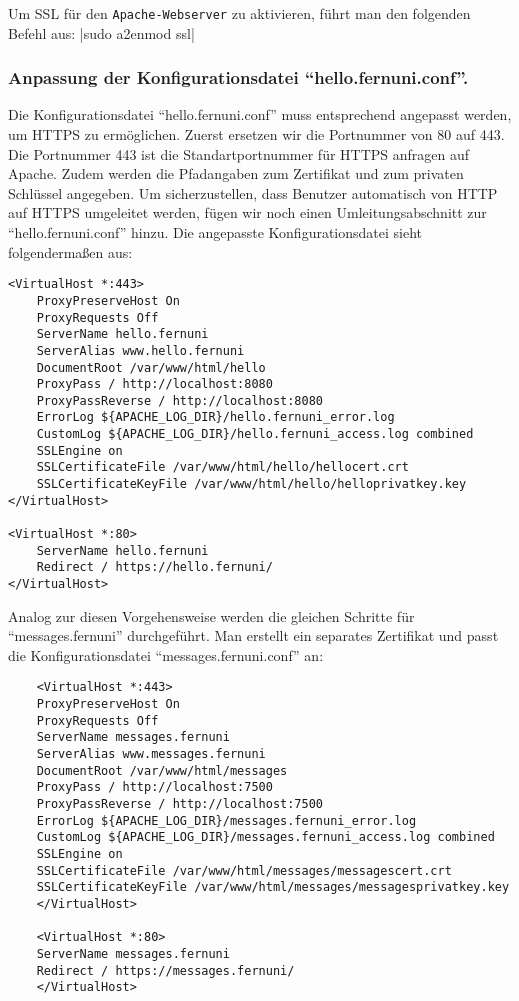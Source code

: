 Um SSL für den \verb+Apache-Webserver+ zu aktivieren, führt man den folgenden Befehl aus:
|sudo a2enmod ssl|

\subsubsection*{Anpassung der Konfigurationsdatei \enquote{hello.fernuni.conf}.}

Die Konfigurationsdatei \enquote{hello.fernuni.conf} muss entsprechend angepasst werden, um HTTPS zu ermöglichen. Zuerst ersetzen wir die Portnummer von 80 auf 443. Die Portnummer 443 ist die Standartportnummer für HTTPS anfragen auf Apache. Zudem werden die Pfadangaben zum Zertifikat und zum privaten Schlüssel angegeben.
Um sicherzustellen, dass Benutzer automatisch von HTTP auf HTTPS umgeleitet werden, fügen wir noch einen Umleitungsabschnitt zur \enquote{hello.fernuni.conf} hinzu. Die angepasste Konfigurationsdatei sieht folgendermaßen aus:
\begin{verbatim}
<VirtualHost *:443>
    ProxyPreserveHost On
    ProxyRequests Off
    ServerName hello.fernuni
    ServerAlias www.hello.fernuni
    DocumentRoot /var/www/html/hello
    ProxyPass / http://localhost:8080
    ProxyPassReverse / http://localhost:8080
    ErrorLog ${APACHE_LOG_DIR}/hello.fernuni_error.log
    CustomLog ${APACHE_LOG_DIR}/hello.fernuni_access.log combined
    SSLEngine on
    SSLCertificateFile /var/www/html/hello/hellocert.crt
    SSLCertificateKeyFile /var/www/html/hello/helloprivatkey.key
</VirtualHost>

<VirtualHost *:80>
    ServerName hello.fernuni
    Redirect / https://hello.fernuni/
</VirtualHost>
\end{verbatim}

Analog zur diesen Vorgehensweise werden die gleichen Schritte für \enquote{messages.fernuni} durchgeführt. Man erstellt ein separates Zertifikat und passt die Konfigurationsdatei \enquote{messages.fernuni.conf} an:

\begin{verbatim}
    <VirtualHost *:443>
    ProxyPreserveHost On
    ProxyRequests Off
    ServerName messages.fernuni
    ServerAlias www.messages.fernuni
    DocumentRoot /var/www/html/messages
    ProxyPass / http://localhost:7500
    ProxyPassReverse / http://localhost:7500
    ErrorLog ${APACHE_LOG_DIR}/messages.fernuni_error.log
    CustomLog ${APACHE_LOG_DIR}/messages.fernuni_access.log combined
    SSLEngine on
    SSLCertificateFile /var/www/html/messages/messagescert.crt
    SSLCertificateKeyFile /var/www/html/messages/messagesprivatkey.key
    </VirtualHost>
    
    <VirtualHost *:80>
    ServerName messages.fernuni
    Redirect / https://messages.fernuni/
    </VirtualHost>
\end{verbatim}


